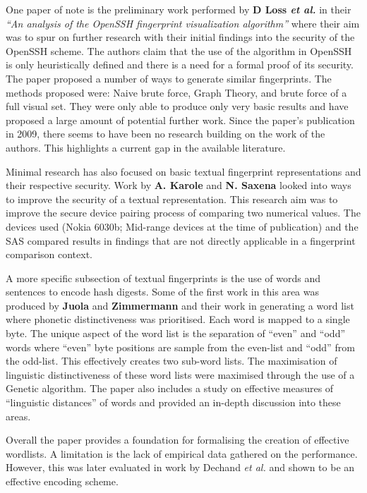 One paper of note is the preliminary work performed by \textbf{D Loss \textit{et al.}}\cite{loss2009drunken} in their \textit{``An analysis of the OpenSSH fingerprint visualization algorithm''} where their aim was to spur on further research with their initial findings into the security of the OpenSSH scheme. The authors claim that the use of the algorithm in OpenSSH is only heuristically defined and there is a need for a formal proof of its security. \\
The paper proposed a number of ways to generate similar fingerprints. The methods proposed were: Naive brute force, Graph Theory, and brute force of a full visual set. They were only able to produce only very basic results and have proposed a large amount of potential further work. Since the paper's publication in 2009, there seems to have been no research building on the work of the authors. This highlights a current gap in the available literature.

Minimal research has also focused on basic textual fingerprint representations and their respective security. Work by \textbf{A. Karole} and \textbf{N. Saxena}\cite{karole2009improving} looked into ways to improve the security of a textual representation. This research aim was to improve the secure device pairing process of comparing two numerical values. The devices used (Nokia 6030b; Mid-range devices at the time of publication) and the SAS compared results in findings that are not directly applicable in a fingerprint comparison context. 

A more specific subsection of textual fingerprints is the use of words and sentences to encode hash digests. Some of the first work in this area was produced by \textbf{Juola} and \textbf{Zimmermann}
\cite{juola1996whole} and their work in generating a word list where phonetic distinctiveness was prioritised. Each word is mapped to a single byte. The unique aspect of the word list is the separation of ``even'' and ``odd'' words where ``even'' byte positions are sample from the even-list and ``odd'' from the odd-list. This effectively creates two sub-word lists. The maximisation of linguistic distinctiveness of these word lists were maximised through the use of a Genetic algorithm. The paper also includes a study on effective measures of ``linguistic distances'' of words and provided an in-depth discussion into these areas.

Overall the paper provides a foundation for formalising the creation of effective wordlists. A limitation is the lack of empirical data gathered on the performance. However, this was later evaluated in work by Dechand \textit{et al.} \cite{dechand2016empirical} and shown to be an effective encoding scheme.

